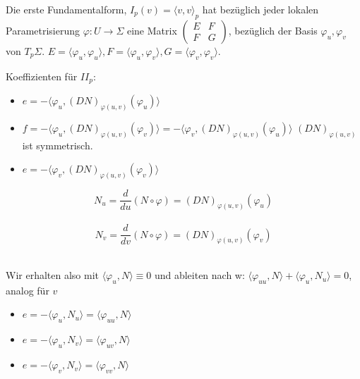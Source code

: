 \documentclass[../main.tex]{subfiles}
\begin{document}
\begin{recall}
    Die erste Fundamentalform, $I_{p}(v) = \langle v,v\rangle_{p}$ hat bezüglich jeder lokalen Parametrisierung $\varphi:U\rightarrow\Sigma$ eine Matrix
    $\begin{pmatrix} E & F \\ F & G \end{pmatrix}$, bezüglich der Basis ${\varphi_{u}, \varphi_{v}}$ von $T_{p}\Sigma$. 
    $E = \langle \varphi_{u}, \varphi_{u}\rangle, F = \langle \varphi_{u}, \varphi_{v}\rangle, G = \langle \varphi_{v}, \varphi_{v}\rangle$.
\end{recall}
Koeffizienten für $II_{p}$:
\begin{itemize}
    \item $e = -\langle \varphi_{u}, (DN)_{\varphi(u,v)}(\varphi_{u})\rangle$
    \item $f = -\langle \varphi_{u}, (DN)_{\varphi(u,v)}(\varphi_{v})\rangle = -\langle \varphi_{v}, (DN)_{\varphi(u,v)}(\varphi_{u})\rangle$
    $(DN)_{\varphi(u,v)}$ ist symmetrisch.
    \item $e = -\langle \varphi_{v}, (DN)_{\varphi(u,v)}(\varphi_{v})\rangle$
\end{itemize}
\begin{notation}
    $$N_{u} = \frac{d}{du}(N\circ\varphi) = (DN)_{\varphi(u,v)}(\varphi_{u})$$\\
    $$N_{v} = \frac{d}{dv}(N\circ\varphi) = (DN)_{\varphi(u,v)}(\varphi_{v})$$\\
\end{notation}
Wir erhalten also mit $\langle \varphi_{u}, N\rangle \equiv 0$ und ableiten nach w: $\langle \varphi_{uu}, N\rangle + \langle \varphi_{u}, N_{u}\rangle = 0$, analog für $v$ 
\begin{itemize}
    \item $e = -\langle \varphi_{u}, N_{u} \rangle = \langle \varphi_{uu}, N \rangle$
    \item $e = -\langle \varphi_{u}, N_{v} \rangle = \langle \varphi_{uv}, N \rangle$
    \item $e = -\langle \varphi_{v}, N_{v} \rangle = \langle \varphi_{vv}, N \rangle$
\end{itemize}
\end{document}
